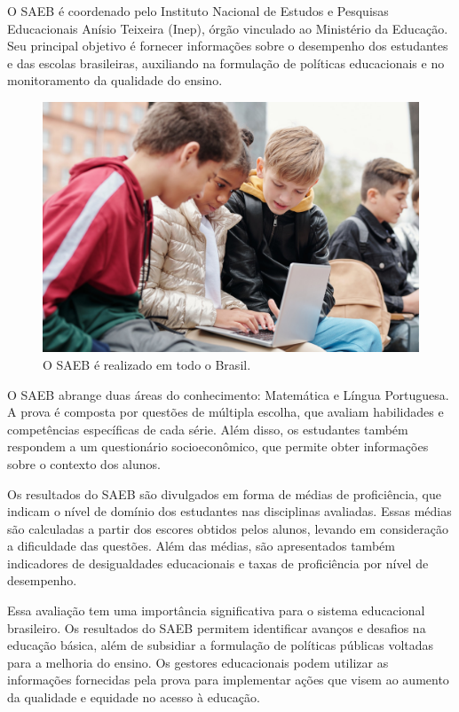 O SAEB é coordenado pelo Instituto Nacional de Estudos e Pesquisas
Educacionais Anísio Teixeira (Inep), órgão vinculado ao Ministério da
Educação. Seu principal objetivo é fornecer informações sobre o
desempenho dos estudantes e das escolas brasileiras, auxiliando na
formulação de políticas educacionais e no monitoramento da qualidade do
ensino.

\begin{figure}
\centering
\includegraphics[width=\textwidth]{./imgs/Imagem002.jpg}
\caption{O SAEB é realizado em todo o Brasil.}
\end{figure}

O SAEB abrange duas áreas do conhecimento: Matemática e Língua
Portuguesa. A prova é composta por questões de múltipla escolha, que
avaliam habilidades e competências específicas de cada série. Além
disso, os estudantes também respondem a um questionário socioeconômico,
que permite obter informações sobre o contexto dos alunos.

Os resultados do SAEB são divulgados em forma de médias de proficiência,
que indicam o nível de domínio dos estudantes nas disciplinas avaliadas.
Essas médias são calculadas a partir dos escores obtidos pelos alunos,
levando em consideração a dificuldade das questões. Além das médias, são
apresentados também indicadores de desigualdades educacionais e taxas de
proficiência por nível de desempenho.

Essa avaliação tem uma importância significativa para o sistema
educacional brasileiro. Os resultados do SAEB permitem identificar
avanços e desafios na educação básica, além de subsidiar a formulação de
políticas públicas voltadas para a melhoria do ensino. Os gestores
educacionais podem utilizar as informações fornecidas pela prova para
implementar ações que visem ao aumento da qualidade e equidade no acesso
à educação.


